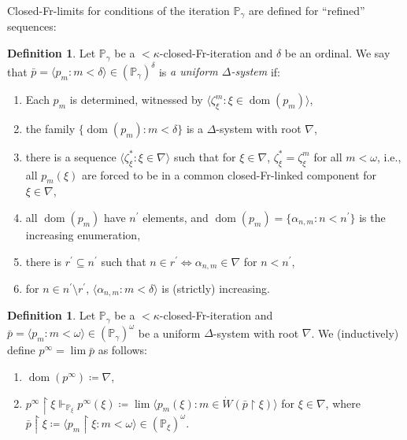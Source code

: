 \documentclass[a4paper,12pt]{amsart}
\theoremstyle{definition}
\newtheorem{dfn}[thm]{Definition}
\numberwithin{thm}{section}
\numberwithin{equation}{section}
\renewcommand{\a}{\alpha}
\newcommand{\p}{\mathbb{P}}
\newcommand{\on}{\mathpunct{\upharpoonright}}
\DeclareMathOperator{\dom}{dom}
\begin{document}
    Closed-Fr-limits for conditions of the iteration $\p_\gamma$ are defined for ``refined'' sequences:
    
    \begin{dfn}
    	\label{dfn:uniform_delta_system}
        Let $\p_\gamma$ be a ${<}\kappa$-closed-Fr-iteration and $\delta$ be an ordinal.
    	We say that $\bar{p}=\langle p_m: m<\delta\rangle\in(\p_\gamma)^\delta$ is \emph{a uniform $\Delta$-system} if:
    	\begin{enumerate}
    		\item Each $p_m$ is determined, witnessed by $\langle\zeta^m_{\xi} :\xi\in\dom(p_m)\rangle$,
    		\item the family $\{\dom(p_m): m<\delta\}$ is a $\Delta$-system with root $\nabla$,
    		\item there is a sequence $\langle\zeta_\xi^{*} :\xi\in\nabla\rangle$ such that for $\xi\in\nabla$, $\zeta_\xi^{*}=\zeta^m_\xi$ for all $m<\omega$, i.e., all $p_m(\xi)$ are forced to be in a common closed-Fr-linked component for $\xi\in\nabla$,
    		\item all $\dom(p_ m)$ have $n^\prime$ elements, and $\dom(p_ m)=\{\a_{n, m}:n<n^\prime\}$ is the increasing enumeration,
    		\item there is $r^\prime\subseteq n^\prime$ such that $n\in r^\prime\Leftrightarrow\a_{n, m}\in\nabla$ for $n<n^\prime$,
    		\item for $n\in n^\prime\setminus r^\prime$, $\langle\a_{n, m}: m<\delta \rangle$ is (strictly) increasing.
    	\end{enumerate}
    \end{dfn}
    
    \begin{dfn} \label{dfn:of_lim_ite}
        Let $\p_\gamma$ be a ${<}\kappa$-closed-Fr-iteration and $\bar{p}=\langle p_m: m<\omega\rangle\in(\p_\gamma)^\omega$ be a uniform $\Delta$-system with root $\nabla$. We (inductively) define $p^\infty=\lim\bar{p}$ as follows:
    	\begin{enumerate}
    		\item $\dom(p^\infty)\coloneq\nabla$,
    		\item $p^\infty\on\xi\Vdash_{\p_\xi} p^\infty(\xi)\coloneq\lim\langle p_m(\xi):m\in\dot{W}(\bar{p}\on\xi)\rangle$ for $\xi\in\nabla$, where $\bar{p}\on\xi\coloneq\langle p_m\on\xi:m<\omega\rangle\in(\p_\xi)^\omega$. \label{eq_lim_second}
    	\end{enumerate}
    \end{dfn}
    
\end{document}
